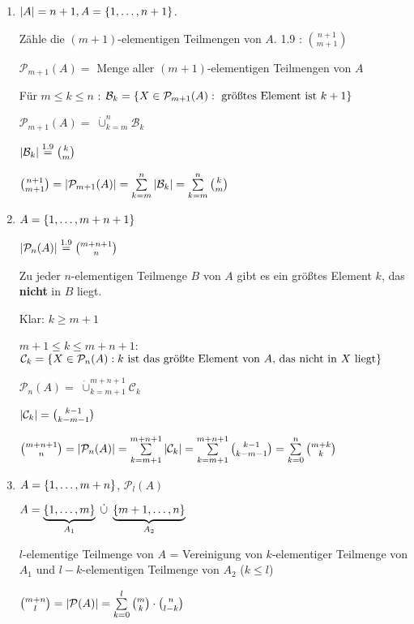 \begin{enumerate}
	
	\item 
	$\left|A\right|= n+1, A = \left\{1, \dots, n+1\right\}$.
	
	Zähle die $(m+1)$-elementigen Teilmengen von $A$. 
	1.9 %
	: $\binom{n+1}{m+1}$
	
	$\mathcal{P}_{m+1}(A) = $ Menge aller $(m+1)$-elementigen Teilmengen von $A$
	
	Für $m \leq k \leq n$ : 
	$\mathcal{B}_k = \left\{X \in \mathcal{P}_{m+1}(A) : \text{ größtes Element ist } k+1  \right\}  $
	
	
	$\mathcal{P}_{m+1}(A) = \;\dot{\cup}_{k=m}^n\mathcal{B}_k\;$ %
	
	
	$\abs{\mathcal{B}_k} \stackrel{1.9}{=} %
	 \binom{k}{m} $

	$\binom{n+1}{m+1} = \abs{\mathcal{P}_{m+1}(A)} 
	                  = \sum_{k=m}^{n}\abs{\mathcal{B}_k}
	                  = \sum_{k=m}^{n}\binom{k}{m} $
	                  
	 \item
	 $A = \left\{1, \dots, m+ n + 1\right\}$
	 
	 $\abs{\mathcal{P}_n(A)} \stackrel{1.9}{=} %
	 \binom{m + n + 1}{n}
	 $                 
	 
	 Zu jeder $n$-elementigen Teilmenge $B$ von $A$ gibt es ein größtes Element $k$, das \textbf{nicht} in $B$ liegt. 
	 
	 Klar: $k \geq m+1$
	 
	 $m + 1 \leq k \leq m + n + 1$:
	 $\mathcal{C}_k = \left\{X \in \mathcal{P}_n(A) : k \text{ ist das größte Element von } A \text{, das nicht in } X \text{ liegt}\right\}$
	 
	 $\mathcal{P}_n(A) = \;\dot{\cup}_{k=m+1}^{m+n+1}\mathcal{C}_k\;$ %
	 
	 $\left|\mathcal{C}_k\right| = \binom{k-1}{k-m-1} $
	 
	 $\binom{m+n+1}{n} = \abs{\mathcal{P}_n (A)}
	                   = \sum_{k=m+1}^{m+n+1}\abs{\mathcal{C}_k}
	                   = \sum_{k=m+1}^{m+n+1}\binom{k-1}{k-m-1}
	                   = \sum_{k=0}^{n}\binom{m+k}{k}
	                    $
	 
	                  	
	\item
	
	$A = \left\{1, \dots, m+n\right\}$, $\mathcal{P}_l(A)$
	
	$A = \underbrace{\left\{1, \dots, m\right\}}_{A_1} \;\dot{\cup}\; \underbrace{\left\{m+1, \dots, n\right\}}_{A_2} $
	
	 $l$-elementige Teilmenge von $A$ = Vereinigung von $k$-elementiger Teilmenge von $A_1$ und $l-k$-elementigen Teilmenge von $A_2$ ($k\leq l$)
	
	$\binom{m+n}{l} = \abs{\mathcal{P}(A)} = \sum_{k = 0}^{l} \binom{m}{k} \cdot \binom{n}{l-k}$
	
\end{enumerate}


